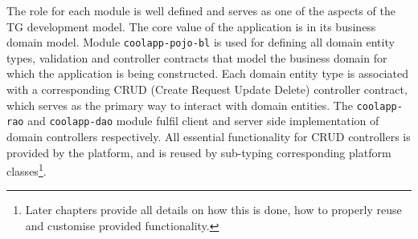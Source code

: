   The role for each module is well defined and serves as one of the aspects of the TG development model.
  The core value of the application is in its business domain model.
  Module \texttt{coolapp-pojo-bl} is used for defining all domain entity types, validation and controller contracts that model the business domain for which the application is being constructed.
  Each domain entity type is associated with a corresponding CRUD (Create Request Update Delete) controller contract, which serves as the primary way to interact with domain entities.
  The \texttt{coolapp-rao} and \texttt{coolapp-dao} module fulfil client and server side implementation of domain controllers respectively.
  All essential functionality for CRUD controllers is provided by the platform, and is reused by sub-typing corresponding platform classes\footnote{Later chapters provide all details on how this is done, how to properly reuse and customise provided functionality.}.